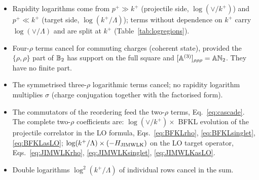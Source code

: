 \begin{summarybox}
\begin{itemize}
\item Rapidity logarithms come from $p^+\gg k^+$ (projectile side, $\log(\vee/k^+)$) and $p^+\ll k^+$ (target side, $\log(k^+/\Lambda)$); terms without dependence on $k^+$ carry $\log(\vee/\Lambda)$ and are split at $k^+$ (Table~\ref{tab:logregions}).
\item Four-$\rho$ terms cancel for commuting charges (coherent state), provided the $\{\rho,\rho\}$ part of $\mathbb{B}_2$ has support on the full square and $[\mathbb{A}^{(3)}]_{\rho\rho\rho}=\mathbb{A}\mathbb{N}_2$. They have no finite part.
\item The symmetrised three-$\rho$ logarithmic terms cancel; no rapidity logarithm multiplies $\sigma$ (charge conjugation together with the factorised form).
\item The commutators of the reordering feed the two-$\rho$ terms, Eq.~\eqref{eq:cascade}. The complete two-$\rho$ coefficients are: $\log(\vee/k^+)\times$ BFKL evolution of the projectile correlator in the LO formula, Eqs.~\eqref{eq:BFKLrho}, \eqref{eq:BFKLsinglet}, \eqref{eq:BFKLasLO}; $\log(k^+/\Lambda)\times(-H_{\rm JIMWLK})$ on the LO target operator, Eqs.~\eqref{eq:JIMWLKrho}, \eqref{eq:JIMWLKsinglet}, \eqref{eq:JIMWLKasLO}.
\item Double logarithms $\log^2(k^+/\Lambda)$ of individual rows cancel in the sum.
\end{itemize}
\end{summarybox}
